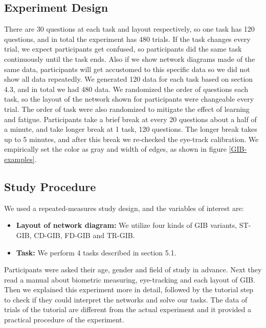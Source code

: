 \documentclass{llncs}
\begin{document}
\subsection{Experiment Design}
There are 30 questions at each task and layout respectively, so one task has 120 questions, and in total the experiment has 480 trials.
If the task changes every trial, we expect participants get confused, so participants did the same task continuously until the task ends.
Also if we show network diagrams made of the same data, participants will get accustomed to this specific data so we did not show all data repeatedly.
We generated 120 data for each task based on section 4.3, and in total we had 480 data.
We randomized the order of questions each task, so the layout of the network shown for participants were changeable every trial.
The order of task were also randomized to mitigate the effect of learning and fatigue.
Participants take a brief break at every 20 questions about a half of a minute, and take longer break at 1 task, 120 questions.
The longer break takes up to 5 minutes, and after this break we re-checked the eye-track calibration.
%
We empirically set the color as gray and width of edges, as shown in figure \ref{GIB-examples}.

\subsection{Study Procedure}

We used a repeated-measures study design, and the variables of interest are:

\begin{itemize}
\item {\bf Layout of network diagram:} We utilize four kinds of GIB variants, ST-GIB, CD-GIB, FD-GIB and TR-GIB.
\item {\bf Task:} We perform 4 tasks described in section 5.1.
\end{itemize}

Participants were asked their age, gender and field of study in advance.
Next they read a manual about biometric measuring, eye-tracking and each layout of GIB.
Then we explained this experiment more in detail, followed by the tutorial step to check if they could interpret the networks and solve our tasks.
The data of trials of the tutorial are different from the actual experiment and it provided a practical procedure of the experiment.
\end{document}
